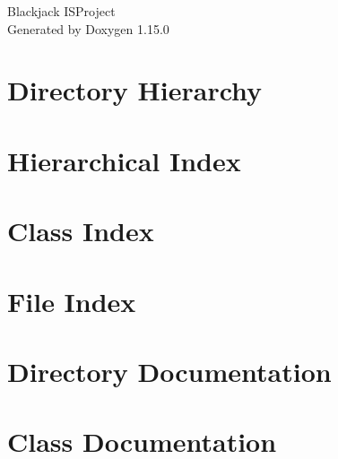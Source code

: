 \documentclass[twoside]{book}
\newcommand{\+}{\discretionary{\mbox{\scriptsize$\hookleftarrow$}}{}{}}
\newcommand{\clearemptydoublepage}{%
    \newpage{\pagestyle{empty}\cleardoublepage}%
  }
\begin{document}
  \raggedbottom
    \hypersetup{pageanchor=false,
                bookmarksnumbered=true,
                pdfencoding=unicode
               }
  \begin{titlepage}
  \vspace*{7cm}
  \begin{center}%
  {\Large Blackjack ISProject}\\
  \vspace*{1cm}
  {\large Generated by Doxygen 1.15.0}\\
  \end{center}
  \end{titlepage}
  \clearemptydoublepage
  \tableofcontents
  \clearemptydoublepage
  \hypersetup{pageanchor=true}

\chapter{Directory Hierarchy}

\chapter{Hierarchical Index}

\chapter{Class Index}

\chapter{File Index}

\chapter{Directory Documentation}








\chapter{Class Documentation}





















\end{document}
